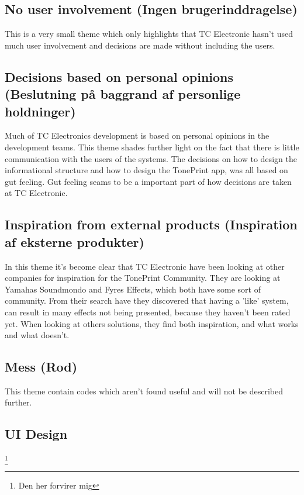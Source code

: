 \subsection*{No user involvement (Ingen brugerinddragelse)} 
\label{ThemeNoUserInvolvement}
This is a very small theme which only highlights that TC Electronic hasn't used much user involvement and decisions are made without including the users. 

\subsection*{Decisions based on personal opinions (Beslutning på baggrand af personlige holdninger)} 
\label{ThemeDecisionsBasedOnPersonalOrpinion}
Much of TC Electronics development is based on personal opinions in the development teams. This theme shades further light on the fact that there is little communication with the users of the systems. The decisions on how to design the informational structure and how to design the TonePrint app, was all based on gut feeling. Gut feeling seams to be a important part of how decisions are taken at TC Electronic.

\subsection*{Inspiration from external products (Inspiration af eksterne produkter)} 
\label{ThemeInspirationFromExternalProducts}
In this theme it's become clear that TC Electronic have been looking at other companies for inspiration for the TonePrint Community. They are looking at Yamahas Soundmondo and Fyres Effects, which both have some sort of community. From their search have they discovered that having a 'like' system, can result in many effects not being presented, because they haven't been rated yet. When looking at others solutions, they find both inspiration, and what works and what doesn't.

\subsection*{Mess (Rod)} 
\label{ThemeMess}
This theme contain codes which aren't found useful and will not be described further.

\subsection*{UI Design} 
\label{ThemeUIDesign}
\footnote{Den her forvirer mig}

